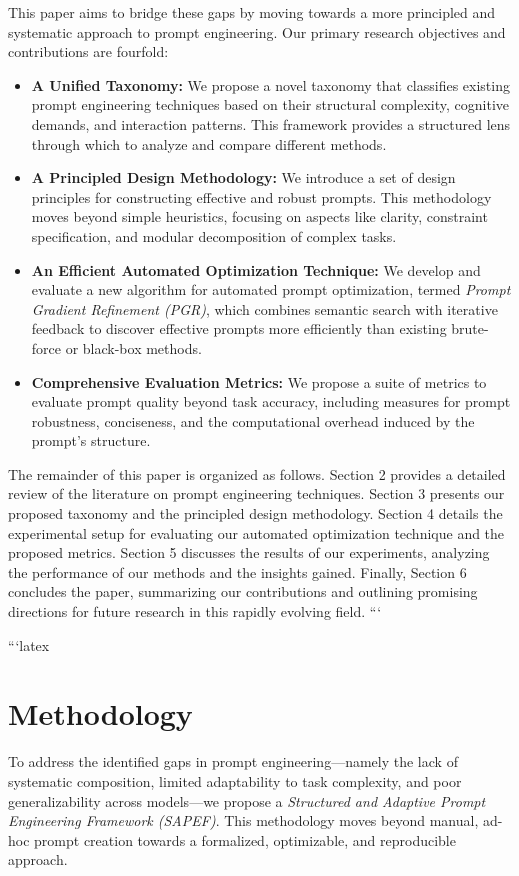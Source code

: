 \documentclass{article}
\begin{document}
This paper aims to bridge these gaps by moving towards a more principled and systematic approach to prompt engineering. Our primary research objectives and contributions are fourfold:
\begin{itemize}
    \item \textbf{A Unified Taxonomy:} We propose a novel taxonomy that classifies existing prompt engineering techniques based on their structural complexity, cognitive demands, and interaction patterns. This framework provides a structured lens through which to analyze and compare different methods.
    \item \textbf{A Principled Design Methodology:} We introduce a set of design principles for constructing effective and robust prompts. This methodology moves beyond simple heuristics, focusing on aspects like clarity, constraint specification, and modular decomposition of complex tasks.
    \item \textbf{An Efficient Automated Optimization Technique:} We develop and evaluate a new algorithm for automated prompt optimization, termed \textit{Prompt Gradient Refinement (PGR)}, which combines semantic search with iterative feedback to discover effective prompts more efficiently than existing brute-force or black-box methods.
    \item \textbf{Comprehensive Evaluation Metrics:} We propose a suite of metrics to evaluate prompt quality beyond task accuracy, including measures for prompt robustness, conciseness, and the computational overhead induced by the prompt's structure.
\end{itemize}

The remainder of this paper is organized as follows. Section 2 provides a detailed review of the literature on prompt engineering techniques. Section 3 presents our proposed taxonomy and the principled design methodology. Section 4 details the experimental setup for evaluating our automated optimization technique and the proposed metrics. Section 5 discusses the results of our experiments, analyzing the performance of our methods and the insights gained. Finally, Section 6 concludes the paper, summarizing our contributions and outlining promising directions for future research in this rapidly evolving field.
```

```latex
\section{Methodology}
To address the identified gaps in prompt engineering---namely the lack of systematic composition, limited adaptability to task complexity, and poor generalizability across models---we propose a \textit{Structured and Adaptive Prompt Engineering Framework (SAPEF)}. This methodology moves beyond manual, ad-hoc prompt creation towards a formalized, optimizable, and reproducible approach.
\end{document}
